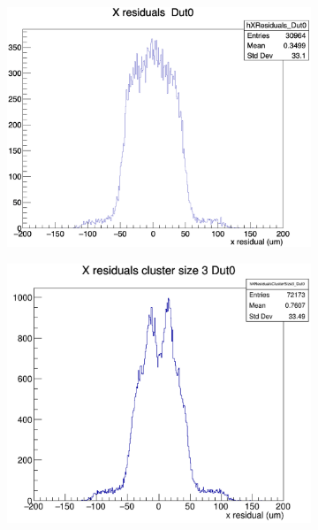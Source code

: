 \begin{figure}[H]
    \centering
    \begin{subfigure}[t]{0.485\textwidth}
        \centering
        \includegraphics[width=\textwidth]{images/XRes_13planes.png}
        \caption{}
        \label{fig:dist_a}
    \end{subfigure}
    \hfill
    \begin{subfigure}[t]{0.45\textwidth}
        \centering
        \includegraphics[width=\textwidth]{images/XRes_size3.png}
        \caption{}
        \label{fig:dist_b}
    \end{subfigure}


\end{figure}

